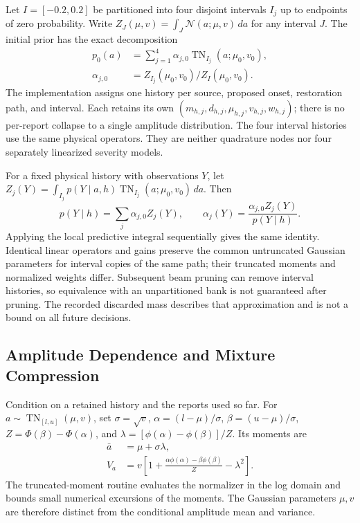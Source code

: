 Let $I=[-0.2,0.2]$ be partitioned into four disjoint intervals $I_j$
up to endpoints of zero probability. Write
$Z_J(\mu,v)=\int_J\mathcal N(a;\mu,v)\,da$ for any interval $J$.
The initial prior has the exact decomposition
\begin{align}
 p_0(a)&=\sum_{j=1}^4\alpha_{j,0}
            \operatorname{TN}_{I_j}(a;\mu_0,v_0),\nonumber\\
 \alpha_{j,0}&=Z_{I_j}(\mu_0,v_0)/Z_I(\mu_0,v_0).
 \label{eq:impl-prior-partition}
\end{align}
The implementation assigns one history per source, proposed onset,
restoration path, and interval. Each retains its own
$(m_{h,j},d_{h,j},\mu_{h,j},v_{h,j},w_{h,j})$; there is no per-report
collapse to a single amplitude distribution. The four interval histories
use the same physical operators. They are neither quadrature nodes nor
four separately linearized severity models.

For a fixed physical history with observations $Y$, let
$Z_j(Y)=\int_{I_j}p(Y\mid a,h)
\operatorname{TN}_{I_j}(a;\mu_0,v_0)\,da$. Then
\begin{equation}
 p(Y\mid h)=\sum_j\alpha_{j,0}Z_j(Y),\qquad
 \alpha_j(Y)=\frac{\alpha_{j,0}Z_j(Y)}{p(Y\mid h)}.
 \label{eq:impl-partition-evidence}
\end{equation}
Applying the local predictive integral sequentially gives the same
identity. Identical linear operators and gains preserve the common
untruncated Gaussian parameters for interval copies of the same path;
their truncated moments and normalized weights differ. Subsequent beam
pruning can remove interval histories, so equivalence with an unpartitioned
bank is not guaranteed after pruning. The recorded discarded mass
describes that approximation and is not a bound on all future decisions.

\subsection{Amplitude Dependence and Mixture Compression}
\label{app:conditional-moments}

Condition on a retained history and the reports used so far. For
$a\sim\operatorname{TN}_{[l,u]}(\mu,v)$, set
$\sigma=\sqrt v$, $\alpha=(l-\mu)/\sigma$,
$\beta=(u-\mu)/\sigma$, $Z=\Phi(\beta)-\Phi(\alpha)$, and
$\lambda=[\phi(\alpha)-\phi(\beta)]/Z$. Its moments are
\begin{align}
 \bar a&=\mu+\sigma\lambda,\nonumber\\
 V_a&=v\left[1+\frac{\alpha\phi(\alpha)-\beta\phi(\beta)}{Z}
                         -\lambda^2\right].
 \label{eq:impl-truncated-moments}
\end{align}
The truncated-moment routine evaluates the normalizer in the log
domain and bounds small numerical excursions of the moments.
The Gaussian parameters $\mu,v$ are therefore distinct from the
conditional amplitude mean and variance.

